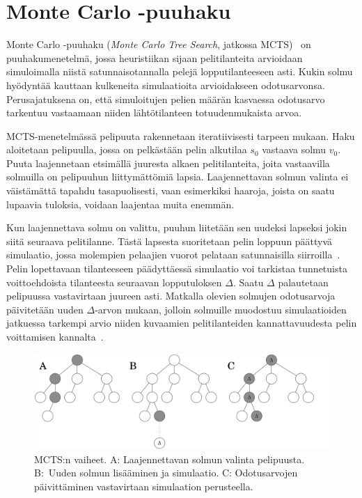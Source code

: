 \documentclass[12pt,finnish]{tktltiki2}
\theoremstyle{definition}
\theoremstyle{remark}
\begin{document}
\section{Monte Carlo -puuhaku}

Monte Carlo -puuhaku (\textit{Monte Carlo Tree Search}, jatkossa MCTS)~\cite{browne} on puuhakumenetelmä, jossa heuristiikan sijaan pelitilanteita arvioidaan simuloimalla niistä satunnaisotannalla pelejä lopputilanteeseen asti. Kukin solmu hyödyntää kauttaan kulkeneita simulaatioita arvioidakseen odotusarvonsa. Perusajatuksena on, että simuloitujen pelien määrän kasvaessa odotusarvo tarkentuu vastaamaan niiden lähtötilanteen totuudenmukaista arvoa.

MCTS-menetelmässä pelipuuta rakennetaan iteratiivisesti tarpeen mukaan. Haku aloitetaan pelipuulla, jossa on pelkästään pelin alkutilaa $s_0$ vastaava solmu $v_0$. Puuta laajennetaan etsimällä juuresta alkaen pelitilanteita, joita vastaavilla solmuilla on pelipuuhun liittymättömiä lapsia. Laajennettavan solmun valinta ei väistämättä tapahdu tasapuolisesti, vaan esimerkiksi haaroja, joista on saatu lupaavia tuloksia, voidaan laajentaa muita enemmän.

Kun laajennettava solmu on valittu, puuhun liitetään sen uudeksi lapseksi jokin siitä seuraava pelitilanne. Tästä lapsesta suoritetaan pelin loppuun päättyvä simulaatio, jossa molempien pelaajien vuorot pelataan satunnaisilla siirroilla~\cite{browne}. Pelin lopettavaan tilanteeseen päädyttäessä simulaatio voi tarkistaa tunnetuista voittoehdoista tilanteesta seuraavan lopputuloksen $\Delta$. Saatu $\Delta$ palautetaan pelipuussa vastavirtaan juureen asti. Matkalla olevien solmujen odotusarvoja päivitetään uuden $\Delta$-arvon mukaan, jolloin solmuille muodostuu simulaatioiden jatkuessa tarkempi arvio niiden kuvaamien pelitilanteiden kannattavuudesta pelin voittamisen kannalta~\cite{browne}.

\begin{figure}

\includegraphics[width = \textwidth]{basicmcts.png}

\caption{MCTS:n vaiheet. A: Laajennettavan solmun valinta pelipuusta. B:~Uuden solmun lisääminen ja simulaatio. C: Odotusarvojen päivittäminen vastavirtaan simulaation perusteella.}
\end{figure}
\end{document}
